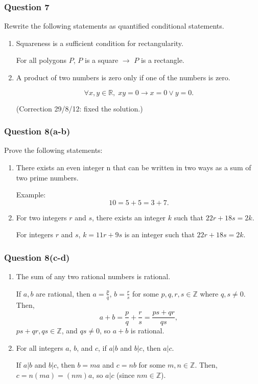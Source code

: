 \documentclass{beamer}
\begin{document}
\begin{frame}
\frametitle{Question 7}
Rewrite the following statements as quantified conditional statements.
\begin{enumerate}
\item
Squareness is a sufficient condition for rectangularity.

\pause
For all polygons $P$, $P$ is a square $\to$ $P$ is a rectangle.

\pause
\item
A product of two numbers is zero only if one of the numbers is zero.

\pause
\[
    \forall x, y \in \mathbb{R}, \; xy = 0 \to x = 0 \lor y = 0.
\]

(Correction 29/8/12: fixed the solution.)
\end{enumerate}
\end{frame}

\begin{frame}
\frametitle{Question 8(a-b)}
Prove the following statements:
\begin{enumerate}
\item
There exists an even integer n that can be written in two ways as a sum of
two prime numbers.

\pause
Example:
\[
    10 = 5 + 5 = 3 + 7.
\]
\pause
\item
For two integers $r$ and $s$, there exists an integer $k$ such that
$22r + 18s = 2k$.

\pause
For integers $r$ and $s$, $k = 11r + 9s$ is an integer such that
$22r + 18s = 2k$.
\end{enumerate}
\end{frame}
\begin{frame}
\frametitle{Question 8(c-d)}

\begin{enumerate}
\item
The sum of any two rational numbers is rational.

\pause
If $a, b$ are rational, then $a = \frac{p}{q}$, $b = \frac{r}{s}$ for some
$p,q,r,s \in \mathbb{Z}$ where $q, s \neq 0$. \pause Then,
\[
    a + b = \frac{p}{q} + \frac{r}{s} = \frac{ps + qr}{qs},
\]
\pause
$ps+qr, qs \in \mathbb{Z}$, and $qs \neq 0$, so $a+b$ is rational.

\pause
\item
For all integers $a$, $b$, and $c$, if $a|b$ and $b|c$, then $a|c$.

\pause
If $a|b$ and $b|c$, then $b = ma$ and $c = nb$ for some $m, n \in \mathbb{Z}$.
\pause Then, $c = n(ma) = (nm)a$, so $a | c$ (since $nm \in \mathbb{Z}$).
\end{enumerate}
\end{frame}
\end{document}
